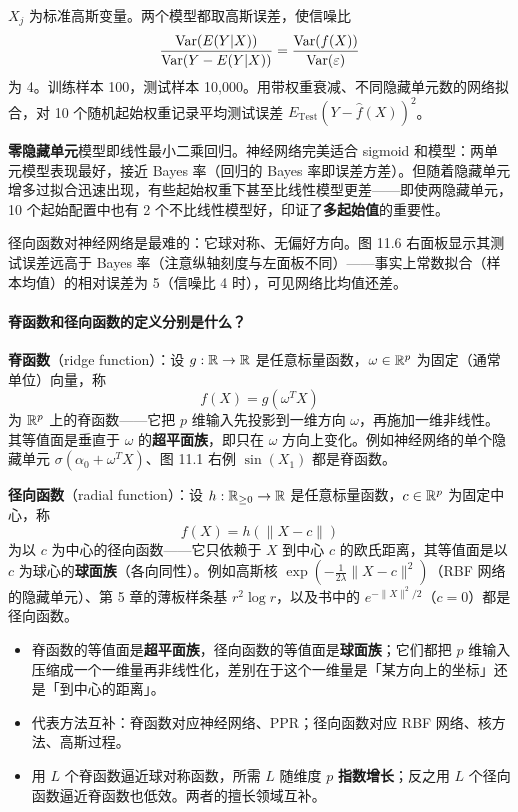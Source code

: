 $X_j$ 为标准高斯变量。两个模型都取高斯误差，使信噪比
\begin{equation}
\frac{\mathrm{Var}(E(Y|X))}{\mathrm{Var}(Y - E(Y|X))} = \frac{\mathrm{Var}(f(X))}{\mathrm{Var}(\varepsilon)} \label{eq:11_18}
\end{equation}
为 4。训练样本 100，测试样本 10{,}000。用带权重衰减、不同隐藏单元数的网络拟合，对 10 个随机起始权重记录平均测试误差 $E_{\mathrm{Test}}(Y-\hat{f}(X))^2$。

\begin{remark}[结论]
\textbf{零隐藏单元}模型即线性最小二乘回归。神经网络完美适合 sigmoid 和模型：两单元模型表现最好，接近 Bayes 率（回归的 Bayes 率即误差方差）。但随着隐藏单元增多过拟合迅速出现，有些起始权重下甚至比线性模型更差——即使两隐藏单元，10 个起始配置中也有 2 个不比线性模型好，印证了\textbf{多起始值}的重要性。

径向函数对神经网络是最难的：它球对称、无偏好方向。图 11.6 右面板显示其测试误差远高于 Bayes 率（注意纵轴刻度与左面板不同）——事实上常数拟合（样本均值）的相对误差为 5（信噪比 4 时），可见网络比均值还差。
\end{remark}

\paragraph{脊函数和径向函数的定义分别是什么？}

\textbf{脊函数}（ridge function）：设 $g:\mathbb{R}\to\mathbb{R}$ 是任意标量函数，$\omega\in\mathbb{R}^p$ 为固定（通常单位）向量，称
\[
f(X) = g(\omega^T X)
\]
为 $\mathbb{R}^p$ 上的脊函数——它把 $p$ 维输入先投影到一维方向 $\omega$，再施加一维非线性。其等值面是垂直于 $\omega$ 的\textbf{超平面族}，即只在 $\omega$ 方向上变化。例如神经网络的单个隐藏单元 $\sigma(\alpha_0+\omega^T X)$、图 11.1 右例 $\sin(X_1)$ 都是脊函数。

\textbf{径向函数}（radial function）：设 $h:\mathbb{R}_{\ge 0}\to\mathbb{R}$ 是任意标量函数，$c\in\mathbb{R}^p$ 为固定中心，称
\[
f(X) = h(\|X-c\|)
\]
为以 $c$ 为中心的径向函数——它只依赖于 $X$ 到中心 $c$ 的欧氏距离，其等值面是以 $c$ 为球心的\textbf{球面族}（各向同性）。例如高斯核 $\exp(-\frac{1}{2\lambda}\|X-c\|^2)$（RBF 网络的隐藏单元）、第 5 章的薄板样条基 $r^2\log r$，以及书中的 $e^{-\|X\|^2/2}$（$c=0$）都是径向函数。

\begin{remark}[两者的对偶关系]
\begin{itemize}
\item 脊函数的等值面是\textbf{超平面族}，径向函数的等值面是\textbf{球面族}；它们都把 $p$ 维输入压缩成一个一维量再非线性化，差别在于这个一维量是「某方向上的坐标」还是「到中心的距离」。
\item 代表方法互补：脊函数对应神经网络、PPR；径向函数对应 RBF 网络、核方法、高斯过程。
\item 用 $L$ 个脊函数逼近球对称函数，所需 $L$ 随维度 $p$ \textbf{指数增长}；反之用 $L$ 个径向函数逼近脊函数也低效。两者的擅长领域互补。
\end{itemize}
\end{remark}

